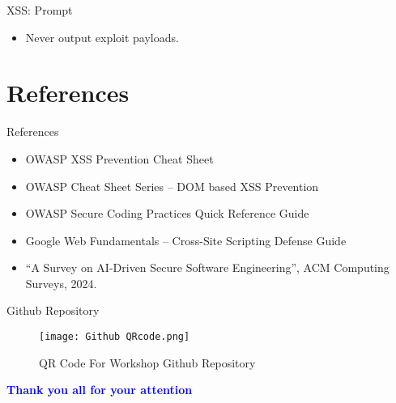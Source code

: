 \documentclass[t,ignorenonframetext]{beamer}
\begin{document}
\begin{frame}{XSS: Prompt}
\begin{tcolorbox}
[colback=blue!5!white,colframe=navy!75!black,title=Tasks (Part 3)]
\begin{itemize}
\item Never output exploit payloads.
\end{itemize}
\end{tcolorbox}
\end{frame} 

\section{References}
\begin{frame}{References}
\tiny
\begin{itemize}
\item OWASP XSS Prevention Cheat Sheet
\item OWASP Cheat Sheet Series – DOM based XSS Prevention
\item OWASP Secure Coding Practices Quick Reference Guide

\item Google Web Fundamentals – Cross-Site Scripting Defense Guide

\item “A Survey on AI-Driven Secure Software Engineering”, ACM Computing Surveys, 2024.

\end{itemize}
\end{frame}

\begin{frame}{Github Repository}
    \begin{figure}[htb]
	\centering
	\texttt{[image: Github QRcode.png]}
    \caption{QR Code For Workshop Github Repository}

     
\end{figure}
\end{frame}
\begin{frame}
\vspace{3cm}
\begin{center}
\begin{LARGE}
\textcolor{blue}{\textbf{Thank you all for your attention}}

\end{LARGE}
\end{center}
\end{frame}
\end{document}
